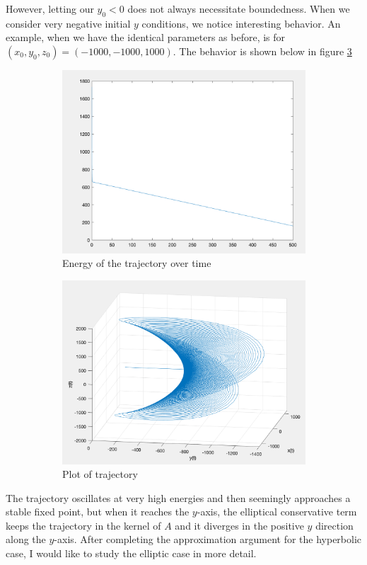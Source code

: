 \documentclass[11pt]{article}
\begin{document}
However, letting our $y_0 < 0$ does not always necessitate boundedness. When we consider very negative initial $y$ conditions, we notice interesting behavior. An example, when we have the identical parameters as before, is for $(x_0, y_0, z_0) = (-1000, -1000, 1000)$. The behavior is shown below in figure \ref{fig:new1}

\begin{figure}[h!]
\centering
\begin{subfigure}{.462\textwidth}
  \centering
  \includegraphics[width=1\linewidth]{new1e.png}
  \caption{Energy of the trajectory over time}
  \label{}
\end{subfigure}%
\begin{subfigure}{.5\textwidth}
  \centering
  \includegraphics[width=0.92\linewidth]{new1p.png}
  \caption{Plot of trajectory}
  \label{}
\end{subfigure}
\caption{}
\label{fig:new1}
\end{figure}

The trajectory oscillates at very high energies and then seemingly approaches a stable fixed point, but when it reaches the $y$-axis, the elliptical conservative term keeps the trajectory in the kernel of $A$ and it diverges in the positive $y$ direction along the $y$-axis. After completing the approximation argument for the hyperbolic case, I would like to study the elliptic case in more detail. 
\end{document}

